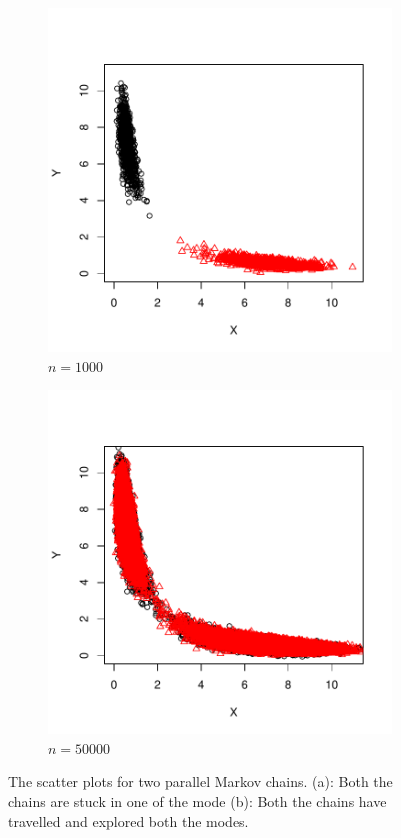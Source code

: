 \documentclass[11pt]{article}
\theoremstyle{remark}
\begin{document}
\begin{figure}[h]
    \centering
    \begin{subfigure}[h]{.4\textwidth}
      \centering
      \includegraphics[width = \textwidth]{plots/scatter_n1000.pdf}
      \caption{$n = 1000$}
      \label{subfig:boom-sp_1e3}
    \end{subfigure}
    \begin{subfigure}[h]{.4\textwidth}
      \centering
      \includegraphics[width = \textwidth]{plots/scatter_n50000.pdf}
      \caption{$n = 50000$}
      \label{boom-sp_1e4}
    \end{subfigure}
    \caption{The scatter plots for two parallel Markov chains. (a): Both the chains are stuck in one of the mode (b): Both the chains have travelled and explored both the modes.}
    \label{fig:boom-sp}
\end{figure}
\end{document}
